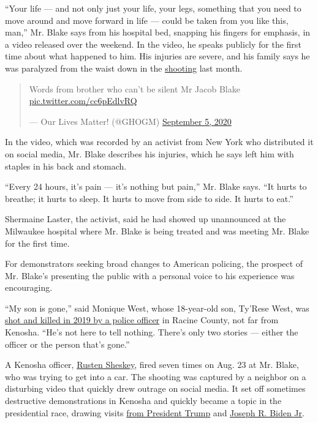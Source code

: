 ``Your life --- and not only just your life, your legs, something that
you need to move around and move forward in life --- could be taken from
you like this, man,'' Mr. Blake says from his hospital bed, snapping his
fingers for emphasis, in a video released over the weekend. In the
video, he speaks publicly for the first time about what happened to him.
His injuries are severe, and his family says he was paralyzed from the
waist down in the
\href{https://www.nytimes3xbfgragh.onion/2020/09/08/us/salt-lake-city-autism-shooting.html}{shooting}
last month.

\begin{quote}
Words from brother who can't be silent Mr Jacob Blake
\href{https://t.co/cc6pEdlvRQ}{pic.twitter.com/cc6pEdlvRQ}

--- Our Lives Matter! (@GHOGM)
\href{https://twitter.com/GHOGM/status/1302314554278412288?ref_src=twsrc\%5Etfw}{September
5, 2020}
\end{quote}

In the video, which was recorded by an activist from New York who
distributed it on social media, Mr. Blake describes his injuries, which
he says left him with staples in his back and stomach.

``Every 24 hours, it's pain --- it's nothing but pain,'' Mr. Blake says.
``It hurts to breathe; it hurts to sleep. It hurts to move from side to
side. It hurts to eat.''

Shermaine Laster, the activist, said he had showed up unannounced at the
Milwaukee hospital where Mr. Blake is being treated and was meeting Mr.
Blake for the first time.

For demonstrators seeking broad changes to American policing, the
prospect of Mr. Blake's presenting the public with a personal voice to
his experience was encouraging.

``My son is gone,'' said Monique West, whose 18-year-old son, Ty'Rese
West, was
\href{https://journaltimes.com/news/local/i-miss-my-babys-smile-hear-what-tyrese-wests-mom-has-to-say-about-her/article_83ec91ab-1aae-57e4-8554-1858de35b5ba.html}{shot
and killed in 2019 by a police officer} in Racine County, not far from
Kenosha. ``He's not here to tell nothing. There's only two stories ---
either the officer or the person that's gone.''

A Kenosha officer,
\href{https://www.nytimes3xbfgragh.onion/2020/08/27/us/kenosha-police-officer-rusten-sheskey.html}{Rusten
Sheskey}, fired seven times on Aug. 23 at Mr. Blake, who was trying to
get into a car. The shooting was captured by a neighbor on a disturbing
video that quickly drew outrage on social media. It set off sometimes
destructive demonstrations in Kenosha and quickly became a topic in the
presidential race, drawing visits
\href{https://www.nytimes3xbfgragh.onion/2020/09/01/us/politics/trump-conspiracy-theory-thugs-plane.html}{from
President Trump} and
\href{https://www.nytimes3xbfgragh.onion/2020/09/03/us/politics/joe-biden-kenosha.html}{Joseph
R. Biden Jr}.

